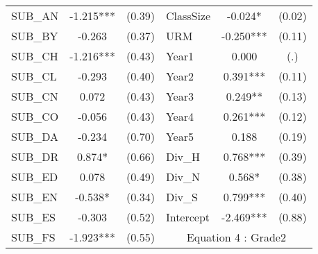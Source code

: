 \begin{table}[H]
\begin{threeparttable}
\begin{tabular}{l c c|l c c }
    SUB\_AN                                      & -1.215***                  & (0.39)               & ClassSize           & -0.024*                & (0.02)               \\
    SUB\_BY                                      & -0.263                     & (0.37)               & URM                 & -0.250***              & (0.11)               \\
    SUB\_CH                                      & -1.216***                  & (0.43)               & Year1               & 0.000                  & (.)                  \\
    SUB\_CL                                      & -0.293                     & (0.40)               & Year2               & 0.391***               & (0.11)               \\
    SUB\_CN                                      & 0.072                      & (0.43)               & Year3               & 0.249**                & (0.13)               \\
    SUB\_CO                                      & -0.056                     & (0.43)               & Year4               & 0.261***               & (0.12)               \\
    SUB\_DA                                      & -0.234                     & (0.70)               & Year5               & 0.188                  & (0.19)               \\
    SUB\_DR                                      & 0.874*                     & (0.66)               & Div\_H              & 0.768***               & (0.39)               \\
    SUB\_ED                                      & 0.078                      & (0.49)               & Div\_N              & 0.568*                 & (0.38)               \\
    SUB\_EN                                      & -0.538*                    & (0.34)               & Div\_S              & 0.799***               & (0.40)               \\
    SUB\_ES                                      & -0.303                     & (0.52)               & Intercept           & -2.469***              & (0.88)               \\
    \cline{4-6}
    SUB\_FS                                      & -1.923***                  & (0.55)               & \multicolumn{3}{c}{Equation 4 : Grade2}                             \\
    \cline{4-6}

\end{tabular}
\end{threeparttable}
\end{table}
